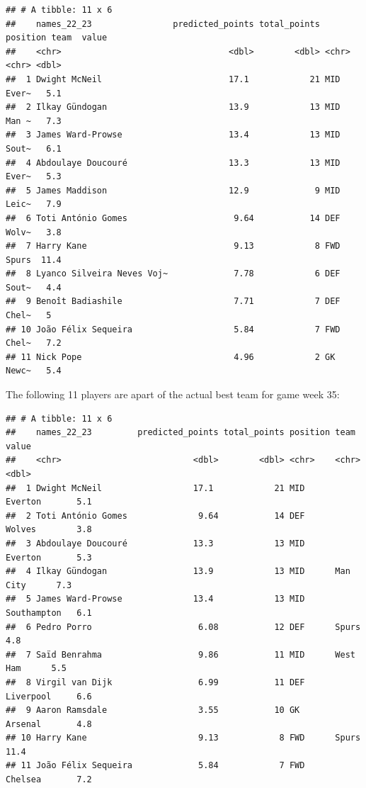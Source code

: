 \documentclass[11pt,preprint, authoryear]{elsarticle}
\numberwithin{equation}{section}
\numberwithin{figure}{section}
\numberwithin{table}{section}
\begin{document}
\begin{verbatim}
## # A tibble: 11 x 6
##    names_22_23                predicted_points total_points position team  value
##    <chr>                                 <dbl>        <dbl> <chr>    <chr> <dbl>
##  1 Dwight McNeil                         17.1            21 MID      Ever~   5.1
##  2 Ilkay Gündogan                        13.9            13 MID      Man ~   7.3
##  3 James Ward-Prowse                     13.4            13 MID      Sout~   6.1
##  4 Abdoulaye Doucouré                    13.3            13 MID      Ever~   5.3
##  5 James Maddison                        12.9             9 MID      Leic~   7.9
##  6 Toti António Gomes                     9.64           14 DEF      Wolv~   3.8
##  7 Harry Kane                             9.13            8 FWD      Spurs  11.4
##  8 Lyanco Silveira Neves Voj~             7.78            6 DEF      Sout~   4.4
##  9 Benoît Badiashile                      7.71            7 DEF      Chel~   5  
## 10 João Félix Sequeira                    5.84            7 FWD      Chel~   7.2
## 11 Nick Pope                              4.96            2 GK       Newc~   5.4
\end{verbatim}

The following 11 players are apart of the actual best team for game week
35:

\begin{verbatim}
## # A tibble: 11 x 6
##    names_22_23         predicted_points total_points position team        value
##    <chr>                          <dbl>        <dbl> <chr>    <chr>       <dbl>
##  1 Dwight McNeil                  17.1            21 MID      Everton       5.1
##  2 Toti António Gomes              9.64           14 DEF      Wolves        3.8
##  3 Abdoulaye Doucouré             13.3            13 MID      Everton       5.3
##  4 Ilkay Gündogan                 13.9            13 MID      Man City      7.3
##  5 James Ward-Prowse              13.4            13 MID      Southampton   6.1
##  6 Pedro Porro                     6.08           12 DEF      Spurs         4.8
##  7 Saïd Benrahma                   9.86           11 MID      West Ham      5.5
##  8 Virgil van Dijk                 6.99           11 DEF      Liverpool     6.6
##  9 Aaron Ramsdale                  3.55           10 GK       Arsenal       4.8
## 10 Harry Kane                      9.13            8 FWD      Spurs        11.4
## 11 João Félix Sequeira             5.84            7 FWD      Chelsea       7.2
\end{verbatim}
\end{document}

